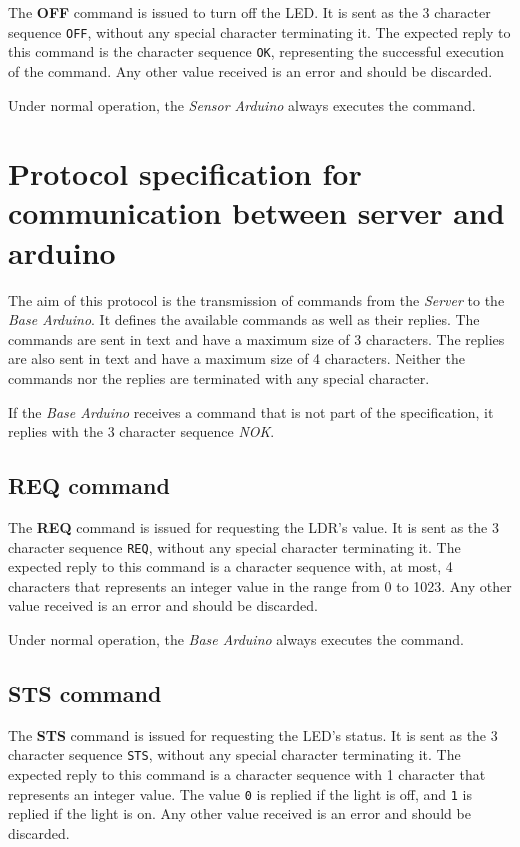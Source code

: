 \documentclass[conference, a4paper]{IEEEtran}
\begin{document}
The \textbf{OFF} command is issued to turn off the LED. It is sent as the 3 character sequence \texttt{OFF}, without any special character terminating it. The expected reply to this command is the character sequence \texttt{OK}, representing the successful execution of the command. Any other value received is an error and should be discarded.

Under normal operation, the \textit{Sensor Arduino} always executes the command.

\section{Protocol specification for communication between server and arduino}
\label{prot_serv}

The aim of this protocol is the transmission of commands from the \textit{Server} to the \textit{Base Arduino}. It defines the available commands as well as their replies. The commands are sent in text and have a maximum size of 3 characters. The replies are also sent in text and have a maximum size of 4 characters. Neither the commands nor the replies are terminated with any special character.

If the \textit{Base Arduino} receives a command that is not part of the specification, it replies with the 3 character sequence \textit{NOK}.

\subsection{REQ command}

The \textbf{REQ} command is issued for requesting the LDR's value. It is sent as the 3 character sequence \texttt{REQ}, without any special character terminating it. The expected reply to this command is a character sequence with, at most, 4 characters that represents an integer value in the range from 0 to 1023. Any other value received is an error and should be discarded.

Under normal operation, the \textit{Base Arduino} always executes the command.

\subsection{STS command}

The \textbf{STS} command is issued for requesting the LED's status. It is sent as the 3 character sequence \texttt{STS}, without any special character terminating it. The expected reply to this command is a character sequence with 1 character that represents an integer value. The value \texttt{0} is replied if the light is off, and \texttt{1} is replied if the light is on. Any other value received is an error and should be discarded.
\end{document}
